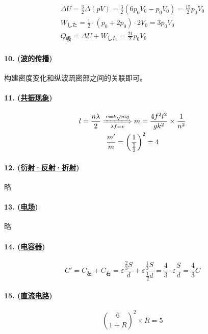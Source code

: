 \begin{gather*}
    \Delta U=\frac32\Delta(pV)=\frac32(6p_0V_0-p_0V_0)=\frac{15}{2}p_0V_0\\
    W_\textrm{した}=\frac12\cdot(p_0+2p_0)\cdot2V_0=3p_0V_0\\
    Q_\textrm{吸}=\Delta U+W_\textrm{した}=\frac{21}{2}p_0V_0
\end{gather*}

\paragraph{10. (\hyperref[subsec:波的传播]{波的传播})} 构建密度变化和纵波疏密部之间的关联即可。
\paragraph{11. (\hyperref[subsec:共振现象]{共振现象})}

\begin{gather*}
    l=\frac{n\lambda}{2}
    \xLongrightarrow[\lambda f=v]{v=k\sqrt{mg}}
    m=\frac{4f^2l^2}{gk^2}\times\frac{1}{n^2}\\
    \frac{m'}{m}=\left(\frac{1}{\frac12}\right)^2=4
\end{gather*}

\paragraph{12. (\hyperref[subsec:衍射·反射·折射]{衍射·反射·折射})} 略
\paragraph{13. (\hyperref[subsec:电场]{电场})} 略
\paragraph{14. (\hyperref[subsec:电容器]{电容器})}

\begin{equation*}
    C'=C_\textrm{左}+C_\textrm{右}
    =\varepsilon\frac{\frac23S}{d}+\varepsilon\frac{\frac13S}{\frac12d}
    =\frac43\cdot\varepsilon\frac Sd
    =\frac43C
\end{equation*}

\paragraph{15. (\hyperref[subsec:直流电路]{直流电路})}

\begin{equation*}
    \left(\frac{6}{1+R}\right)^2\times R=5
\end{equation*}

